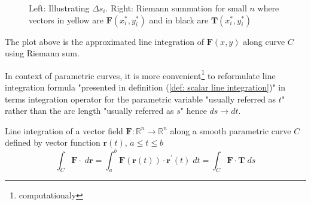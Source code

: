 \documentclass[../../main.tex]{subfiles}
\begin{document}
\begin{solution}
\begin{figure*}[h]
\begin{subfigure}[c]{0.45\textwidth}
			\end{subfigure}
			\caption{Left: Illustrating $\Delta s_i$. Right: Riemann summation for small $n$ where vectors in yellow are $\mathbf{F}(x_i^*, y_i^*)$ and in black are $\mathbf{T}(x_i^*, y_i^*)$}
		\end{figure*}
	
		The plot above is the approximated line integration of $\mathbf{F}(x,y)$ along curve $C$ using Riemann sum.
	\end{solution}
	
	\par In context of parametric curves, it is more convenient\footnote{computationaly} to reformulate line integration formula  "presented in definition (\ref{def: scalar line integration})" in terms integration operator for the parametric variable "usually referred as $t$" rather than the arc length "usually referred as $s$" hence $ds \rightarrow dt$.
	
	\begin{definition}
		Line integration of a vector field $\mathbf{F}: \mathbb{R}^n \rightarrow \mathbb{R}^n$ along a smooth parametric curve $C$ defined by vector function $\mathbf{r}(t)$, $a \leq t \leq b$ 
		\begin{equation*}
			\int_C \mathbf{F} \cdot \; d\mathbf{r} = \int_a^b \mathbf{F}(\mathbf{r}(t)) \cdot \mathbf{r}^\prime(t) \; dt = \int_C \mathbf{F} \cdot \mathbf{T} \; ds
		\end{equation*}
	\end{definition}
\end{document}
